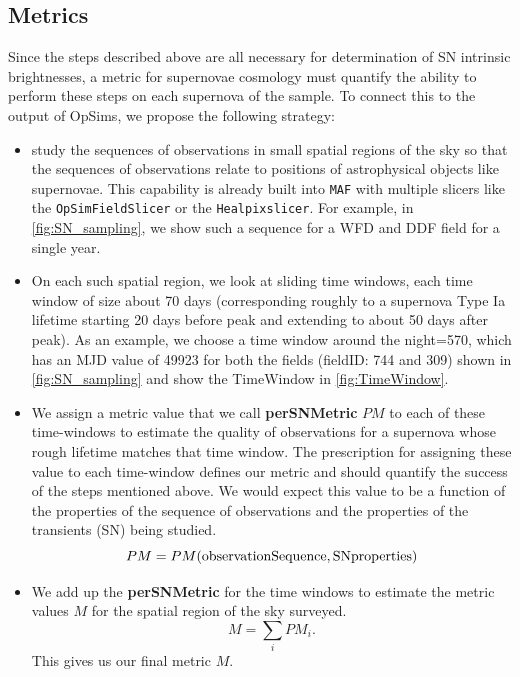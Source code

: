 
\subsection{Metrics}
\label{sec:\secname:metrics}


Since the steps described above are all necessary for determination of
SN intrinsic brightnesses, a metric for supernovae cosmology must
quantify the ability to perform these steps on each supernova of the
sample. To connect this to the output of OpSims, we propose the
following strategy:
\begin{itemize}
    \item study the sequences of observations in small spatial regions
    of the sky so that the sequences of observations relate to positions
    of astrophysical objects like supernovae. This capability is already
    built into \texttt{MAF} with multiple slicers like the
    \texttt{OpSimFieldSlicer} or the \texttt{Healpixslicer}. For example, in
    \autoref{fig:SN_sampling}, we show such a sequence for a WFD and
    DDF field for a single year.
    \item On each such spatial region, we look at sliding time windows,
    each time window of size about 70 days (corresponding roughly to a
    supernova Type Ia  lifetime starting 20 days before peak and
    extending to about 50 days after peak). As an example, we choose a
    time window around the night=570, which has an MJD value of 49923
    for both the fields (fieldID: 744 and 309) shown in
    \autoref{fig:SN_sampling} and show the TimeWindow in
    \autoref{fig:TimeWindow}.
    \item  We assign a metric value that we call \textbf{perSNMetric}
    $PM$ to each of these time-windows to estimate the quality of
    observations for a supernova whose rough lifetime matches that time
    window. The prescription for assigning these value to each
    time-window defines our metric and should quantify the success of
    the steps mentioned above. We would expect this value to be a
    function of the properties of the sequence of observations and the
    properties of the transients (SN) being studied. $$ PM =
    PM(\rm{observation Sequence, SN properties})$$
    \item We add up the \textbf{perSNMetric} for the time windows to
    estimate the metric values $M$ for the spatial region of the sky
    surveyed. $$M = \sum_i PM_i. $$ This gives us our final metric $M$. 
\end{itemize}

